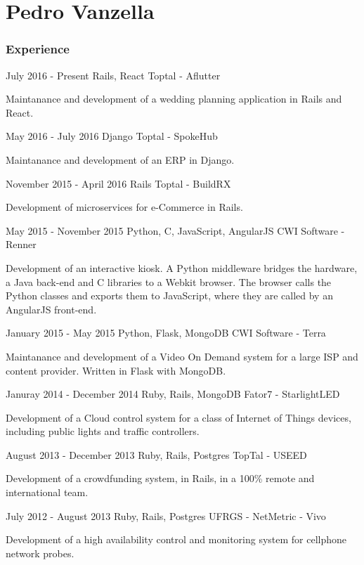 \documentclass{tccv}
\begin{document}
\part{Pedro Vanzella}

\section{Experience}

\begin{eventlist}

\item{July 2016 - Present}
  {Rails, React}
  {Toptal - Aflutter}

Maintanance and development of a wedding planning application in Rails and
React.

\item{May 2016 - July 2016}
  {Django}
  {Toptal - SpokeHub}

Maintanance and development of an ERP in Django.

\item{November 2015 - April 2016}
  {Rails}
  {Toptal - BuildRX}

Development of microservices for e-Commerce in Rails.

\item{May 2015 - November 2015}
     {Python, C, JavaScript, AngularJS}
     {CWI Software - Renner}
     
Development of an interactive kiosk. A Python middleware bridges the hardware, a
Java back-end and C libraries to a Webkit browser. The browser calls the Python
classes and exports them to JavaScript, where they are called by an AngularJS front-end.

\item{January 2015 - May 2015}
     {Python, Flask, MongoDB}
     {CWI Software - Terra}

Maintanance and development of a Video On Demand system for a large ISP and
content provider. Written in Flask with MongoDB.

\item{Januray 2014 - December 2014}
     {Ruby, Rails, MongoDB}
     {Fator7 - StarlightLED}

Development of a Cloud control system for a class of Internet of Things devices,
including public lights and traffic controllers.

\item{August 2013 - December 2013}
     {Ruby, Rails, Postgres}
     {TopTal - USEED}

Development of a crowdfunding system, in Rails, in a 100\% remote and
international team.

\item{July 2012 - August 2013}
     {Ruby, Rails, Postgres}
     {UFRGS - NetMetric - Vivo}
 
Development of a high availability control and monitoring system for cellphone
network probes.

\end{eventlist}
\end{document}
